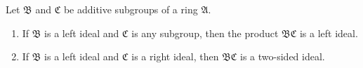 Let $\mathfrak{B}$ and $\mathfrak{C}$ be additive subgroups of a ring $\mathfrak{A}$.

\begin{enumerate}
\item If $\mathfrak{B}$ is a left ideal and $\mathfrak{C}$ is any subgroup, then the product $\mathfrak{B}\mathfrak{C}$ is a left ideal.
\item If $\mathfrak{B}$ is a left ideal and $\mathfrak{C}$ is a right ideal, then $\mathfrak{B}\mathfrak{C}$ is a two-sided ideal.
\end{enumerate}
